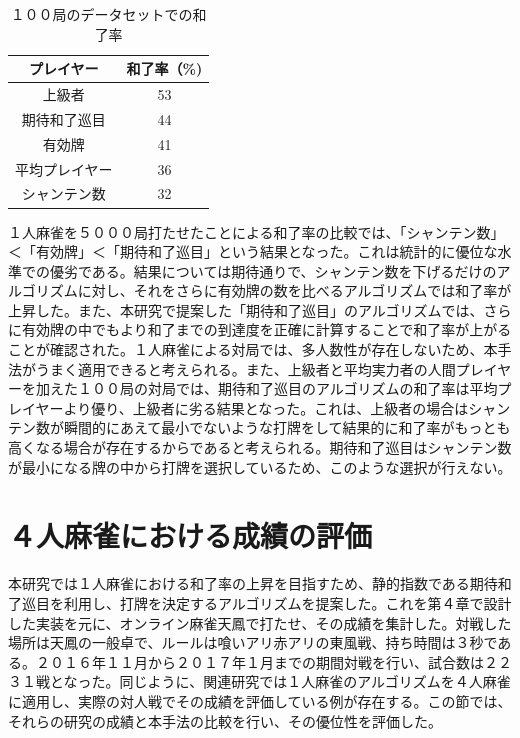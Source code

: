 \begin{table}[h]
  \caption{１００局のデータセットでの和了率}
  \label{100houra}
  \begin{center}
  \begin{tabular}{c|c}
    \hline
    プレイヤー   & 和了率（\%)\\\hline\hline
    上級者 	& 53 \\\hline
    期待和了巡目 & 44 \\\hline
    有効牌 	& 41 \\\hline
    平均プレイヤー 	& 36\\\hline
    シャンテン数	& 32 \\\hline
  \end{tabular}\end{center}
\end{table}

１人麻雀を５０００局打たせたことによる和了率の比較では、「シャンテン数」＜「有効牌」＜「期待和了巡目」という結果となった。これは統計的に優位な水準での優劣である。結果については期待通りで、シャンテン数を下げるだけのアルゴリズムに対し、それをさらに有効牌の数を比べるアルゴリズムでは和了率が上昇した。また、本研究で提案した「期待和了巡目」のアルゴリズムでは、さらに有効牌の中でもより和了までの到達度を正確に計算することで和了率が上がることが確認された。１人麻雀による対局では、多人数性が存在しないため、本手法がうまく適用できると考えられる。また、上級者と平均実力者の人間プレイヤーを加えた１００局の対局では、期待和了巡目のアルゴリズムの和了率は平均プレイヤーより優り、上級者に劣る結果となった。これは、上級者の場合はシャンテン数が瞬間的にあえて最小でないような打牌をして結果的に和了率がもっとも高くなる場合が存在するからであると考えられる。期待和了巡目はシャンテン数が最小になる牌の中から打牌を選択しているため、このような選択が行えない。


\section{４人麻雀における成績の評価} %
本研究では１人麻雀における和了率の上昇を目指すため、静的指数である期待和了巡目を利用し、打牌を決定するアルゴリズムを提案した。これを第４章で設計した実装を元に、オンライン麻雀天鳳で打たせ、その成績を集計した。対戦した場所は天鳳の一般卓で、ルールは喰いアリ赤アリの東風戦、持ち時間は３秒である。２０１６年１１月から２０１７年１月までの期間対戦を行い、試合数は２２３１戦となった。同じように、関連研究では１人麻雀のアルゴリズムを４人麻雀に適用し、実際の対人戦でその成績を評価している例が存在する。この節では、それらの研究の成績と本手法の比較を行い、その優位性を評価した。

